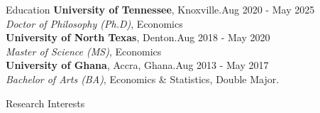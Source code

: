 \documentclass{resume}
\begin{document}

\begin{rSection}{Education}
\textbf{University of Tennessee}, Knoxville.{\hfill{Aug 2020 - May 2025}\\}
{\sl Doctor of Philosophy (Ph.D)}, Economics\\
    
\textbf{University of North Texas}, Denton.{\hfill{Aug 2018 - May 2020}\\}
{\sl Master of Science (MS)}, Economics\\
    
\textbf{University of Ghana}, Accra, Ghana.{\hfill{Aug 2013 - May 2017}\\}
{\sl Bachelor of Arts (BA)}, Economics \& Statistics, Double Major.\\
\end{rSection}

\begin{rSection}{Research Interests}
\\
\\
\\
\\
\end{rSection}
\end{document}
